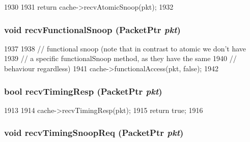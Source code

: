 \begin{DoxyCode}
1930 {
1931     return cache->recvAtomicSnoop(pkt);
1932 }
\end{DoxyCode}
\hypertarget{classCache_1_1MemSidePort_a284dfb90c168233c9d416bc07de8fefe}{
\subsubsection[{recvFunctionalSnoop}]{\setlength{\rightskip}{0pt plus 5cm}void recvFunctionalSnoop ({\bf PacketPtr} {\em pkt})}}
\label{classCache_1_1MemSidePort_a284dfb90c168233c9d416bc07de8fefe}



\begin{DoxyCode}
1937 {
1938     // functional snoop (note that in contrast to atomic we don't have
1939     // a specific functionalSnoop method, as they have the same
1940     // behaviour regardless)
1941     cache->functionalAccess(pkt, false);
1942 }
\end{DoxyCode}
\hypertarget{classCache_1_1MemSidePort_a482dba5588f4bee43e498875a61e5e0b}{
\subsubsection[{recvTimingResp}]{\setlength{\rightskip}{0pt plus 5cm}bool recvTimingResp ({\bf PacketPtr} {\em pkt})}}
\label{classCache_1_1MemSidePort_a482dba5588f4bee43e498875a61e5e0b}



\begin{DoxyCode}
1913 {
1914     cache->recvTimingResp(pkt);
1915     return true;
1916 }
\end{DoxyCode}
\hypertarget{classCache_1_1MemSidePort_aff3031c56fc4947a19695c868bb8233e}{
\subsubsection[{recvTimingSnoopReq}]{\setlength{\rightskip}{0pt plus 5cm}void recvTimingSnoopReq ({\bf PacketPtr} {\em pkt})}}
\label{classCache_1_1MemSidePort_aff3031c56fc4947a19695c868bb8233e}



